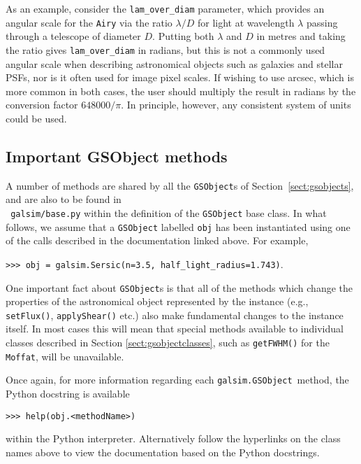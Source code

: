 \documentclass[preprint,11pt]{aastex}
\begin{document}
As an example, consider the
\texttt{lam\_over\_diam} parameter, which provides an angular scale for
the \texttt{Airy} via
the ratio $\lambda / D$ for light at wavelength $\lambda$ passing
through a telescope of diameter $D$. Putting both $\lambda$ and
$D$ in metres and taking the ratio gives \texttt{lam\_over\_diam} in
radians, but this is not a commonly used angular scale when describing
astronomical objects such as galaxies and stellar PSFs, nor is
it often used for image pixel scales.  If wishing to use arcsec, which
is more common in both cases, the user should multiply the result in
radians by the conversion factor
$648000 / \pi$.  In principle, however, any consistent
system of units could be used.


\subsection{Important GSObject methods}\label{sect:gsobjectmethods}
A number of methods are shared by all the \texttt{GSObject}s of
Section~\ref{sect:gsobjects}, and are also to be found in \\ {\tt
 galsim/base.py} within the definition of the
\texttt{GSObject} base class.  In what follows, we assume that a
\texttt{GSObject} labelled \texttt{obj} has been instantiated using
one of the calls described in the documentation linked above.  For
example,

{\tt >>> obj = galsim.Sersic(n=3.5, half\_light\_radius=1.743)}.

One important fact about \texttt{GSObject}s is that all of the
methods which change the properties of the astronomical object
represented by the instance (e.g., \texttt{setFlux()},
  \texttt{applyShear()} etc.) also make fundamental changes to the
  instance itself.  In most cases this will mean that special methods
  available to individual classes described in Section
  \ref{sect:gsobjectclasses}, such as \texttt{getFWHM()} for the
  \texttt{Moffat}, will be unavailable.

Once again, for more information regarding each \texttt{galsim.GSObject}~method,
the Python docstring is available

{\tt >>> help(obj.<methodName>)}

within the Python interpreter.  Alternatively follow the hyperlinks on
the class names above to view the documentation based
on the Python docstrings. 
\end{document}

